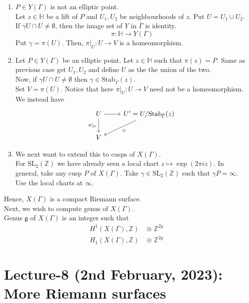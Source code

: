 \documentclass[oneside, 12pt]{scrbook}
\newcommand{\ZZ}{\mathbb Z}
\newcommand{\SL}{\mathrm{SL}}
\newcommand{\HH}{\mathbb{H}}
\newcommand{\Stab}{\mathrm{Stab}}
\theoremstyle{theorem}
\begin{document}
\begin{enumerate}
\item $P \in Y(\Gamma)$ is not an elliptic point. \\

Let $z\in \HH$ be a lift of $P$ and $U_{1},U_{2}$ be neighbourhoods of $z$. Put $U=U_{1} \cup U_{2}$. If $\gamma U \cap U \neq \emptyset$, then the image set of $Y$ in $\bar{\Gamma}$ is identity. 
$$\pi : \HH \rightarrow Y(\Gamma)$$
Put $\gamma   = \pi (U)$. Then, $\pi|_{U} : U \rightarrow V$ is a homeomorphism. 

\item Let $P \in Y(\Gamma)$ be an elliptic point. Let $z\in \HH$ such that $\pi(z) = P$. Same as previous case get $U_{1},U_{2}$ and define $U$ as the the union of the two. \\
Now, if $\gamma U \cap U \neq \emptyset$ then $\gamma \in \Stab_{\bar{\Gamma}}(z)$. \\
Set $V= \pi (U)$. Notice that here $\pi|_{U}: U \rightarrow V$ need not be a homeomorphism. We instead have 
\[\begin{tikzcd}
	U & {U'=U/\mathrm{Stab}_{\bar{\Gamma}}(z)} \\
	V
	\arrow["{\pi|_{U} }"', from=1-1, to=2-1]
	\arrow[from=1-1, to=1-2]
	\arrow["\simeq", from=1-2, to=2-1]
\end{tikzcd}\]

\item We next want to extend this to cusps of $X(\Gamma)$. \\
For $\SL_{2}(\ZZ)$ we have already seen a local chart $z\mapsto \exp(2 \pi i z)$. In general, take any cusp $P$ of $X(\Gamma)$. Take $\gamma \in \SL_{2}(\ZZ)$ such that $\gamma P = \infty$. Use the local charts at $\infty$.
\end{enumerate}
Hence, $X(\Gamma)$ is a compact Riemann surface. \\

Next, we wish to compute genus of $X(\Gamma)$. \\
Genus $\mathfrak{g}$ of $X(\Gamma)$ is an integer such that 
\begin{align*}
H^1(X(\Gamma), \ZZ) &\cong \ZZ^{2g} \\
H_{1}(X(\Gamma), \ZZ) &\cong \ZZ^{2g}
\end{align*}



\chapter{Lecture-8 (2nd February, 2023): More Riemann surfaces}
\end{document}
